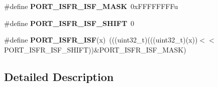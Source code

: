 \begin{DoxyCompactItemize}
\item 
\mbox{\label{group___p_o_r_t___register___masks_gabb5d188f3dfe38f0d8bbb870e81fb7e3}} 
\#define {\bfseries P\+O\+R\+T\+\_\+\+I\+S\+F\+R\+\_\+\+I\+S\+F\+\_\+\+M\+A\+SK}~0x\+F\+F\+F\+F\+F\+F\+F\+Fu
\item 
\mbox{\label{group___p_o_r_t___register___masks_ga678f290447622562272513d57eb2bf78}} 
\#define {\bfseries P\+O\+R\+T\+\_\+\+I\+S\+F\+R\+\_\+\+I\+S\+F\+\_\+\+S\+H\+I\+FT}~0
\item 
\mbox{\label{group___p_o_r_t___register___masks_gae1ab6f959d1aa15059efd14641caf2e7}} 
\#define {\bfseries P\+O\+R\+T\+\_\+\+I\+S\+F\+R\+\_\+\+I\+SF}(x)~(((uint32\+\_\+t)(((uint32\+\_\+t)(x))$<$$<$P\+O\+R\+T\+\_\+\+I\+S\+F\+R\+\_\+\+I\+S\+F\+\_\+\+S\+H\+I\+FT))\&P\+O\+R\+T\+\_\+\+I\+S\+F\+R\+\_\+\+I\+S\+F\+\_\+\+M\+A\+SK)
\end{DoxyCompactItemize}


\subsection{Detailed Description}
